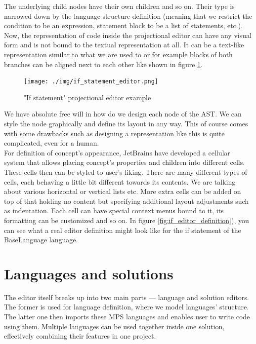 The underlying child nodes have their own children and so on.
Their type is narrowed down by the language structure definition (meaning that we restrict the condition to be an expression, statement block to be a list of statements, etc.).
\\

Now, the representation of code inside the projectional editor can have any visual form and is not bound to the textual representation at all.
It can be a text-like representation similar to what we are used to or for example blocks of both branches can be aligned next to each other like shown in figure \ref{fig:if_editor}.
\\

\begin{figure}[h]
	\centering
	\hspace{-4mm}
	\texttt{[image: ./img/if\_statement\_editor.png]}
	\caption{"If statement" projectional editor example}
	\label{fig:if_editor}
\end{figure}

We have absolute free will in how do we design each node of the AST.
We can style the node graphically and define its layout in any way.
This of course comes with some drawbacks such as designing a representation like this is quite complicated, even for a human.
\\

For definition of concept's appearance, JetBrains have developed a cellular system that allows placing concept's properties and children into different cells.
These cells then can be styled to user's liking.
There are many different types of cells, each behaving a little bit different towards its contents.
We are talking about various horizontal or vertical lists etc.
More extra cells can be added on top of that holding no content but specifying additional layout adjustments such as indentation.
Each cell can have special context menus bound to it, its formatting can be customized and so on.
In figure {\ref{fig:if_editor_definition})}, you can see what a real editor definition might look like for the if statement of the BaseLanguage language.

\section{Languages and solutions}

The editor itself breaks up into two main parts --- language and solution editors.
The former is used for language definition, where we model languages' structure.
The latter one then imports these MPS languages and enables user to write code using them.
Multiple languages can be used together inside one solution, effectively combining their features in one project.

